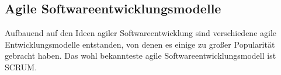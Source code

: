 \subsection{Agile Softwareentwicklungsmodelle}
\label{Agile Softwareentwicklungsmodelle}
Aufbauend auf den Ideen agiler Softwareentwicklung sind verschiedene agile Entwicklungsmodelle entstanden, von denen es einige zu großer Popularität gebracht haben. Das wohl bekannteste agile Softwareentwicklungsmodell ist \gls{SCRUM}.